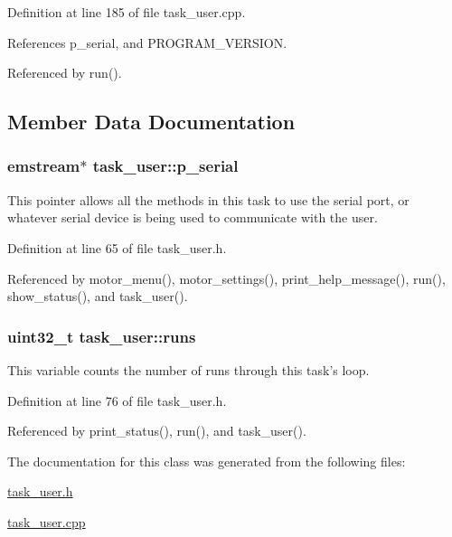\-Definition at line 185 of file task\-\_\-user.\-cpp.



\-References p\-\_\-serial, and \-P\-R\-O\-G\-R\-A\-M\-\_\-\-V\-E\-R\-S\-I\-O\-N.



\-Referenced by run().



\subsection{\-Member \-Data \-Documentation}
\hypertarget{classtask__user_a04ed5c2b4d7c9a1530bde6f217e01681}{
\subsubsection[{p\-\_\-serial}]{\setlength{\rightskip}{0pt plus 5cm}emstream$\ast$ {\bf task\-\_\-user\-::p\-\_\-serial}}}\label{classtask__user_a04ed5c2b4d7c9a1530bde6f217e01681}
\-This pointer allows all the methods in this task to use the serial port, or whatever serial device is being used to communicate with the user. 

\-Definition at line 65 of file task\-\_\-user.\-h.



\-Referenced by motor\-\_\-menu(), motor\-\_\-settings(), print\-\_\-help\-\_\-message(), run(), show\-\_\-status(), and task\-\_\-user().

\hypertarget{classtask__user_ac85973422902084fc9a4692250be32fe}{
\subsubsection[{runs}]{\setlength{\rightskip}{0pt plus 5cm}uint32\-\_\-t {\bf task\-\_\-user\-::runs}}}\label{classtask__user_ac85973422902084fc9a4692250be32fe}
\-This variable counts the number of runs through this task's loop. 

\-Definition at line 76 of file task\-\_\-user.\-h.



\-Referenced by print\-\_\-status(), run(), and task\-\_\-user().



\-The documentation for this class was generated from the following files\-:\begin{DoxyCompactItemize}
\item 
\hyperlink{task__user_8h}{task\-\_\-user.\-h}\item 
\hyperlink{task__user_8cpp}{task\-\_\-user.\-cpp}\end{DoxyCompactItemize}
